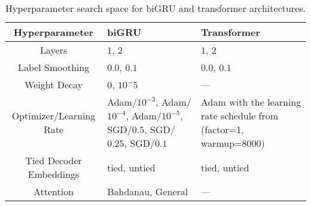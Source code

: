 \begin{table}
    \centering
    \begin{tabular}{cp{4.25cm}p{4.25cm}}
            \toprule
            Hyperparameter & biGRU & Transformer\\
            \midrule
            Layers & $1$, $2$ & $1$, $2$\\
            Label Smoothing & $0.0$, $0.1$ & $0.0$, $0.1$\\
            Weight Decay & $0$, $10^-5$ & --- \\
Optimizer/Learning Rate & Adam/$10^{-3}$, Adam/$10^{-4}$, Adam/$10^{-5}$,
            SGD/$0.5$, SGD/$0.25$, SGD/$0.1$ & Adam with the learning
            rate schedule from \cite{rush2018} (factor=1, warmup=8000)\\
        Tied Decoder Embeddings & tied, untied & tied, untied\\
        Attention & Bahdanau, General & ---\\
        \bottomrule
\end{tabular}
\caption{Hyperparameter search space for biGRU and transformer architectures.}
\label{tab:nlghpsspace}
\end{table}
